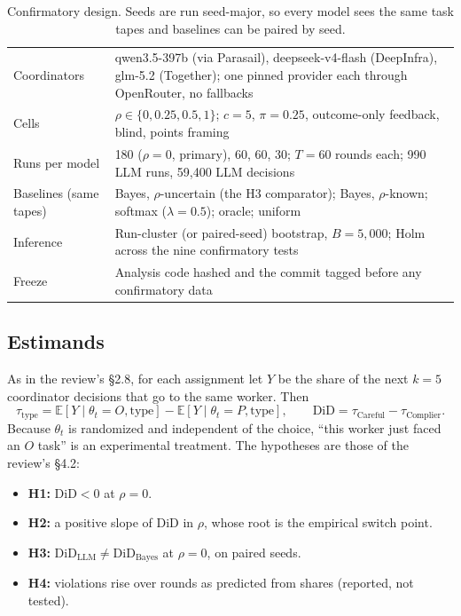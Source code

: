 \documentclass[11pt,a4paper]{article}
\newcommand{\did}{\mathrm{DiD}}
\begin{document}
\begin{table}[h]
\centering\small
\caption{Confirmatory design. Seeds are run seed-major, so every model sees the same task tapes and baselines can be paired by seed.}
\label{tab:design}
\begin{tabularx}{\linewidth}{lX}
\toprule
Coordinators & qwen3.5-397b (via Parasail), deepseek-v4-flash (DeepInfra), glm-5.2 (Together); one pinned provider each through OpenRouter, no fallbacks \\
Cells & $\rho\in\{0, 0.25, 0.5, 1\}$; $c=5$, $\pi=0.25$, outcome-only feedback, blind, points framing \\
Runs per model & 180 ($\rho=0$, primary), 60, 60, 30; $T=60$ rounds each; 990 LLM runs, 59{,}400 LLM decisions \\
Baselines (same tapes) & Bayes, $\rho$-uncertain (the H3 comparator); Bayes, $\rho$-known; softmax ($\lambda=0.5$); oracle; uniform \\
Inference & Run-cluster (or paired-seed) bootstrap, $B=5{,}000$; Holm across the nine confirmatory tests \\
Freeze & Analysis code hashed and the commit tagged before any confirmatory data \\
\bottomrule
\end{tabularx}
\end{table}

\subsection{Estimands}

As in the review's \S2.8, for each assignment let $Y$ be the share of the next $k=5$ coordinator decisions that go to the same worker. Then
\begin{equation}
\tau_{\text{type}} = \mathbb{E}[Y\mid\theta_t=O,\text{type}]-\mathbb{E}[Y\mid\theta_t=P,\text{type}],
\qquad \did = \tau_{\text{Careful}}-\tau_{\text{Complier}}.
\end{equation}
Because $\theta_t$ is randomized and independent of the choice, ``this worker just faced an $O$ task'' is an experimental treatment. The hypotheses are those of the review's \S4.2:
\begin{itemize}
  \item \textbf{H1:} $\did<0$ at $\rho=0$.
  \item \textbf{H2:} a positive slope of $\did$ in $\rho$, whose root is the empirical switch point.
  \item \textbf{H3:} $\did_{\text{LLM}}\ne\did_{\text{Bayes}}$ at $\rho=0$, on paired seeds.
  \item \textbf{H4:} violations rise over rounds as predicted from shares (reported, not tested).
\end{itemize}
\end{document}
